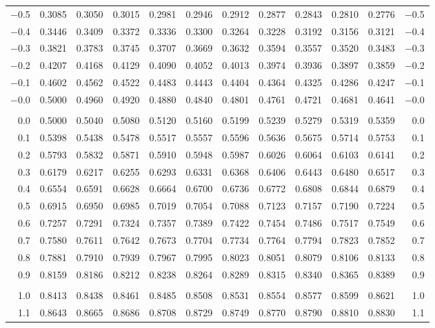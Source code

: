 \documentclass[12pt]{article}
\begin{document}
\begin{landscape}
\begin{adjustbox}{angle=270}
\begin{tabular}{r@{\hspace{4.5mm}}
	*5{c @{\hspace{2.5mm}}}@{\hspace{-0.5mm}}*5{@{\hspace{2.5mm}}c}@{\hspace{2mm}}r}
$-$0.5 & 0.3085 & 0.3050 & 0.3015 & 0.2981 & 0.2946 & 0.2912 & 0.2877 & 0.2843 & 0.2810 & 0.2776 & $-$0.5 \\
$-$0.4 & 0.3446 & 0.3409 & 0.3372 & 0.3336 & 0.3300 & 0.3264 & 0.3228 & 0.3192 & 0.3156 & 0.3121 & $-$0.4 \\
$-$0.3 & 0.3821 & 0.3783 & 0.3745 & 0.3707 & 0.3669 & 0.3632 & 0.3594 & 0.3557 & 0.3520 & 0.3483 & $-$0.3 \\
$-$0.2 & 0.4207 & 0.4168 & 0.4129 & 0.4090 & 0.4052 & 0.4013 & 0.3974 & 0.3936 & 0.3897 & 0.3859 & $-$0.2 \\
$-$0.1 & 0.4602 & 0.4562 & 0.4522 & 0.4483 & 0.4443 & 0.4404 & 0.4364 & 0.4325 & 0.4286 & 0.4247 & $-$0.1 \\
$-$0.0 & 0.5000 & 0.4960 & 0.4920 & 0.4880 & 0.4840 & 0.4801 & 0.4761 & 0.4721 & 0.4681 & 0.4641 & $-$0.0 \\
&&&&&&&&&&{} \\
0.0 & 0.5000 & 0.5040 & 0.5080 & 0.5120 & 0.5160 & 0.5199 & 0.5239 & 0.5279 & 0.5319 & 0.5359 & 0.0 \\
0.1 & 0.5398 & 0.5438 & 0.5478 & 0.5517 & 0.5557 & 0.5596 & 0.5636 & 0.5675 & 0.5714 & 0.5753 & 0.1 \\
0.2 & 0.5793 & 0.5832 & 0.5871 & 0.5910 & 0.5948 & 0.5987 & 0.6026 & 0.6064 & 0.6103 & 0.6141 & 0.2 \\
0.3 & 0.6179 & 0.6217 & 0.6255 & 0.6293 & 0.6331 & 0.6368 & 0.6406 & 0.6443 & 0.6480 & 0.6517 & 0.3 \\
0.4 & 0.6554 & 0.6591 & 0.6628 & 0.6664 & 0.6700 & 0.6736 & 0.6772 & 0.6808 & 0.6844 & 0.6879 & 0.4 \\
0.5 & 0.6915 & 0.6950 & 0.6985 & 0.7019 & 0.7054 & 0.7088 & 0.7123 & 0.7157 & 0.7190 & 0.7224 & 0.5 \\
0.6 & 0.7257 & 0.7291 & 0.7324 & 0.7357 & 0.7389 & 0.7422 & 0.7454 & 0.7486 & 0.7517 & 0.7549 & 0.6 \\
0.7 & 0.7580 & 0.7611 & 0.7642 & 0.7673 & 0.7704 & 0.7734 & 0.7764 & 0.7794 & 0.7823 & 0.7852 & 0.7 \\
0.8 & 0.7881 & 0.7910 & 0.7939 & 0.7967 & 0.7995 & 0.8023 & 0.8051 & 0.8079 & 0.8106 & 0.8133 & 0.8 \\
0.9 & 0.8159 & 0.8186 & 0.8212 & 0.8238 & 0.8264 & 0.8289 & 0.8315 & 0.8340 & 0.8365 & 0.8389 & 0.9 \\
&&&&&&&&&&{} \\
1.0 & 0.8413 & 0.8438 & 0.8461 & 0.8485 & 0.8508 & 0.8531 & 0.8554 & 0.8577 & 0.8599 & 0.8621 & 1.0 \\
1.1 & 0.8643 & 0.8665 & 0.8686 & 0.8708 & 0.8729 & 0.8749 & 0.8770 & 0.8790 & 0.8810 & 0.8830 & 1.1 \\

\end{tabular}
\end{adjustbox}
\end{landscape}
\end{document}
